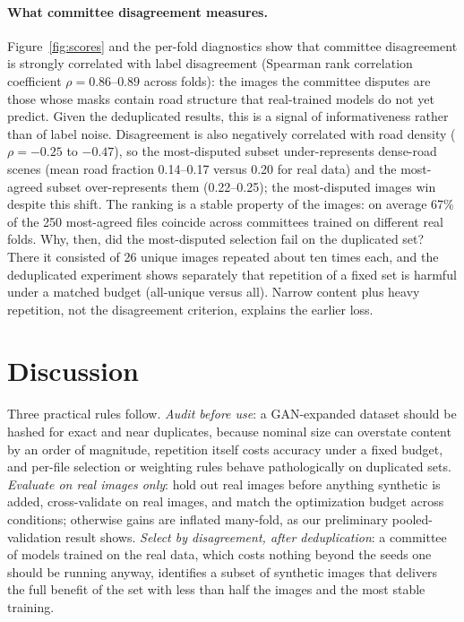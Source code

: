 \documentclass[11pt]{article}
\begin{document}
\paragraph{What committee disagreement measures.} Figure~\ref{fig:scores} and the per-fold diagnostics show that committee disagreement is strongly correlated with label disagreement (Spearman rank correlation coefficient $\rho=0.86$--$0.89$ across folds): the images the committee disputes are those whose masks contain road structure that real-trained models do not yet predict. Given the deduplicated results, this is a signal of informativeness rather than of label noise. Disagreement is also negatively correlated with road density ($\rho=-0.25$ to $-0.47$), so the most-disputed subset under-represents dense-road scenes (mean road fraction 0.14--0.17 versus 0.20 for real data) and the most-agreed subset over-represents them (0.22--0.25); the most-disputed images win despite this shift. The ranking is a stable property of the images: on average 67\% of the 250 most-agreed files coincide across committees trained on different real folds. Why, then, did the most-disputed selection fail on the duplicated set? There it consisted of 26 unique images repeated about ten times each, and the deduplicated experiment shows separately that repetition of a fixed set is harmful under a matched budget (all-unique versus all). Narrow content plus heavy repetition, not the disagreement criterion, explains the earlier loss.

\section{Discussion}

Three practical rules follow. \emph{Audit before use}: a GAN-expanded dataset should be hashed for exact and near duplicates, because nominal size can overstate content by an order of magnitude, repetition itself costs accuracy under a fixed budget, and per-file selection or weighting rules behave pathologically on duplicated sets. \emph{Evaluate on real images only}: hold out real images before anything synthetic is added, cross-validate on real images, and match the optimization budget across conditions; otherwise gains are inflated many-fold, as our preliminary pooled-validation result shows. \emph{Select by disagreement, after deduplication}: a committee of models trained on the real data, which costs nothing beyond the seeds one should be running anyway, identifies a subset of synthetic images that delivers the full benefit of the set with less than half the images and the most stable training.
\end{document}
